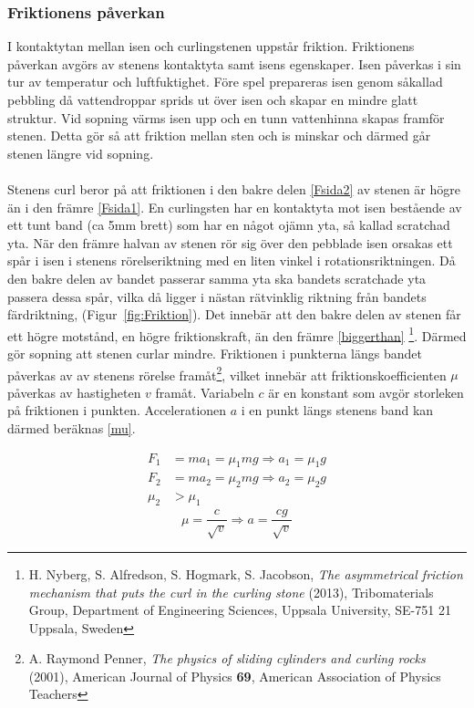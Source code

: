 \documentclass[11pt]{article} %
\begin{document}
\subsubsection{Friktionens påverkan}
I kontaktytan mellan isen och curlingstenen uppstår friktion. 
Friktionens påverkan avgörs av stenens kontaktyta samt isens egenskaper. 
Isen påverkas i sin tur av temperatur och luftfuktighet. 
Före spel prepareras isen genom såkallad pebbling då vattendroppar sprids ut över isen och skapar en mindre glatt struktur.
Vid sopning värms isen upp och en tunn vattenhinna skapas framför stenen. Detta gör så att friktion mellan sten och is minskar och därmed går stenen längre vid sopning.  
\\\\Stenens curl beror på att friktionen i den bakre delen \eqref{Fsida2} av stenen är högre än i den främre \eqref{Fsida1}.  
En curlingsten har en kontaktyta mot isen bestående av ett tunt band (ca 5mm brett) som har en något ojämn yta, så kallad scratchad yta. 
När den främre halvan av stenen rör sig över den pebblade isen orsakas ett spår i isen i stenens rörelseriktning med en liten vinkel i rotationsriktningen. 
Då den bakre delen av bandet passerar samma yta ska bandets scratchade yta passera dessa spår, vilka då ligger i nästan rätvinklig riktning från bandets färdriktning, (Figur~\ref{fig:Friktion}). 
Det innebär att den bakre delen av stenen får ett högre motstånd, en högre friktionskraft, än den främre \eqref{biggerthan}
\footnote{H. Nyberg, S. Alfredson, S. Hogmark, S. Jacobson, \emph{The asymmetrical friction mechanism that puts the curl in the curling stone} (2013), Tribomaterials Group, Department of Engineering Sciences, Uppsala University, SE-751 21 Uppsala, Sweden}.
Därmed gör sopning att stenen curlar mindre. Friktionen i punkterna längs bandet påverkas av av stenens rörelse framåt\footnote{A. Raymond Penner, \emph{The physics of sliding cylinders and curling rocks} (2001), American Journal of Physics \textbf{69}, American Association of Physics Teachers},
vilket innebär att friktionskoefficienten $\mu$ påverkas av hastigheten $v$ framåt. Variabeln $c$ är en konstant som avgör storleken på friktionen i punkten. Accelerationen $a$ i en punkt längs stenens band kan därmed beräknas \eqref{mu}.

 \begin{align}\label{Fsida1}
 F_1& = ma_1 = \mu_1 mg \Rightarrow a_1 = \mu_1 g \\\label{Fsida2}
 F_2& = ma_2 = \mu_2 mg \Rightarrow a_2 = \mu_2g \\\label{biggerthan}
 \mu_2& > \mu_1
 \end{align}
\begin{equation}\label{mu} 
\mu = \frac{c}{\sqrt{v}} \Rightarrow a = \frac{cg}{\sqrt{v}} 
\end{equation}
\end{document}
